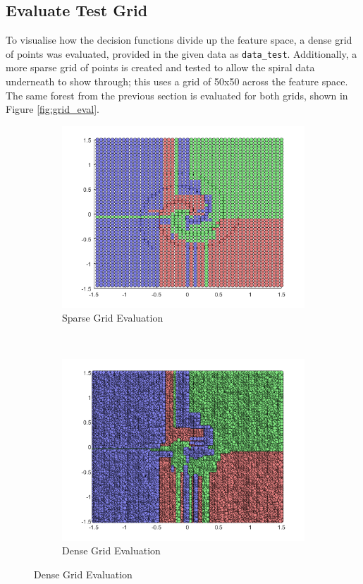 \documentclass[a4paper, 10pt, conference]{ieeeconf}
\begin{document}
\subsection{Evaluate Test Grid}

To visualise how the decision functions divide up the feature space, a dense grid of points was evaluated, provided in the given data as \texttt{data\_test}. Additionally, a more sparse grid of points is created and tested to allow the spiral data underneath to show through; this uses a grid of 50x50 across the feature space. The same forest from the previous section is evaluated for both grids, shown in Figure \ref{fig:grid_eval}.

\begin{figure}[!ht]
  \captionsetup[subfigure]{position=b}
  \centering
    \begin{subfigure}{0.45\linewidth}
      \includegraphics[width=\textwidth]{img/sparse_grid}
      \caption{Sparse Grid Evaluation}
      \label{fig:sparse_grid}
    \end{subfigure}
    ~
    \begin{subfigure}{0.45\linewidth}
      \includegraphics[width=\textwidth]{img/dense_grid}
      \caption{Dense Grid Evaluation}
      \label{fig:dense_grid}
    \end{subfigure}


\end{figure}
\end{document}
